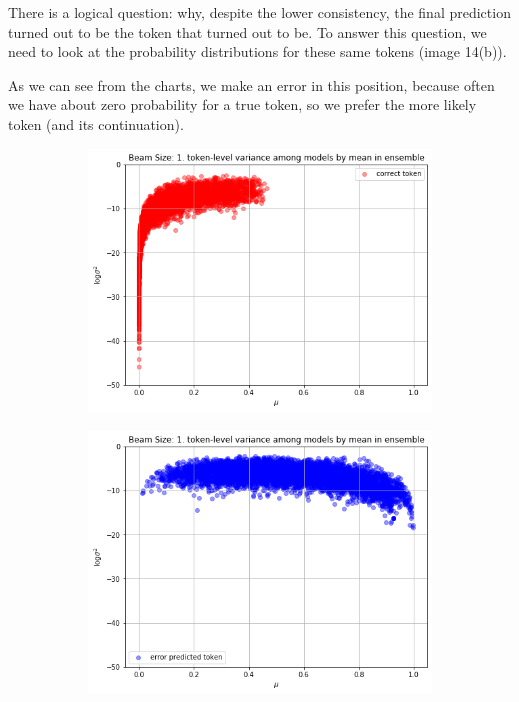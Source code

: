 \documentclass[a4paper,14pt]{extarticle}
\begin{document}
	There is a logical question: why, despite the lower consistency, the final prediction turned out to be the token that turned out to be. To answer this question, we need to look at the probability distributions for these same tokens (image 14(b)).
	
	As we can see from the charts, we make an error in this position, because often we have about zero probability for a true token, so we prefer the more likely token (and its continuation).
	
	\begin{figure}[t]
		\begin{subfigure}{.5\textwidth}
			\includegraphics[width=\textwidth]{images/inens_scatter_correct.png}
		\end{subfigure}
		\begin{subfigure}{.5\textwidth}
			\includegraphics[width=\textwidth]{images/inens_scatter_error.png}
		\end{subfigure}
	\end{figure}
\end{document}

